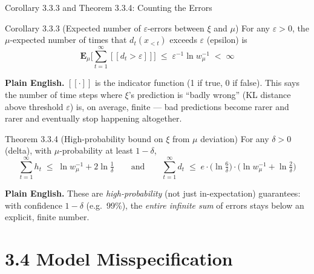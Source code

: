 \documentclass[aspectratio=169,10pt]{beamer}
\begin{document}
\begin{frame}{Corollary 3.3.3 and Theorem 3.3.4: Counting the Errors}
  \begin{block}{Corollary 3.3.3 (Expected number of $\varepsilon$-errors between $\xi$ and $\mu$)}
    For any $\varepsilon>0$, the $\mu$-expected number of times that
    $d_t(x_{<t})$ exceeds $\varepsilon$ (epsilon) is
    \[
      \mathbf{E}_\mu\Big[\textstyle\sum_{t=1}^\infty [\![d_t>\varepsilon]\!]\Big] \; \le \; \varepsilon^{-1}\ln w_\mu^{-1} \; < \; \infty
    \]
  \end{block}
  \textbf{Plain English.} $[\![\cdot]\!]$ is the indicator function (1 if
  true, 0 if false). This says the number of time steps where $\xi$'s
  prediction is ``badly wrong'' (KL distance above threshold $\varepsilon$)
  is, on average, finite --- bad predictions become rarer and rarer and
  eventually stop happening altogether.

  \begin{block}{Theorem 3.3.4 (High-probability bound on $\xi$ from $\mu$ deviation)}
    For any $\delta>0$ (delta), with $\mu$-probability at least $1-\delta$,
    \[
      \sum_{t=1}^\infty h_t \; \le \; \ln w_\mu^{-1} + 2\ln\tfrac1\delta
      \qquad\text{and}\qquad
      \sum_{t=1}^\infty d_t \; \le \; e\cdot\big(\ln\tfrac6\delta\big)\cdot\big(\ln w_\mu^{-1}+\ln\tfrac2\delta\big)
    \]
  \end{block}
  \textbf{Plain English.} These are \emph{high-probability} (not just
  in-expectation) guarantees: with confidence $1-\delta$ (e.g.\ 99\%), the
  \emph{entire infinite sum} of errors stays below an explicit, finite number.
\end{frame}

\section{3.4 Model Misspecification}
\end{document}
